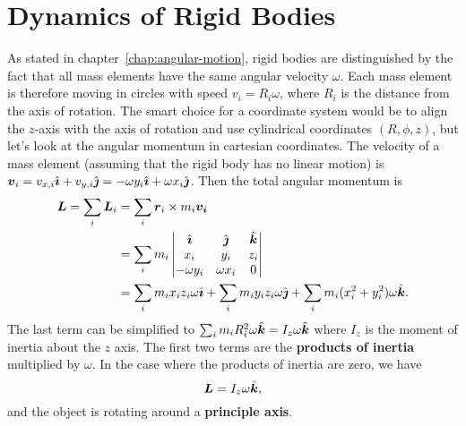\documentclass[../classical_mechanics.tex]{subfiles}
\begin{document}
    \section{Dynamics of Rigid Bodies}\label{sec:dynamics-of-rigid-bodies}
        As stated in chapter~\ref{chap:angular-motion}, rigid bodies are distinguished by the fact that all mass elements have the same angular velocity $\omega$.
        Each mass element is therefore moving in circles with speed $v_i=R_i\omega$, where $R_i$ is the distance from the axis of rotation.
        The smart choice for a coordinate system would be to align the $z$-axis with the axis of rotation and use cylindrical coordinates $(R,\phi,z)$, but let's look at the angular momentum in cartesian coordinates.
        The velocity of a mass element (assuming that the rigid body has no linear motion) is $\boldsymbol{v}_i=v_{x,i}\hat{\boldsymbol{\imath}}+v_{y,i}\hat{\boldsymbol{\jmath}}=-\omega y_i\hat{\boldsymbol{\imath}}+\omega x_i\hat{\boldsymbol{\jmath}}$.
        Then the total angular momentum is
        \begin{align}
            \boldsymbol{L}=\sum_i\boldsymbol{L}_i&=\sum_i\boldsymbol{r}_i\times m_i\boldsymbol{v_i}\\
            &=\sum_i m_i\begin{vmatrix}
                \hat{\boldsymbol{\imath}} & \hat{\boldsymbol{\jmath}} & \hat{\boldsymbol{k}} \\
                x_i & y_i & z_i \\
                -\omega y_i & \omega x_i & 0
            \end{vmatrix}\\
            &=\sum_i m_ix_iz_i\omega\hat{\boldsymbol{\imath}}+\sum_i m_iy_iz_i\omega\hat{\boldsymbol{\jmath}}+\sum_i m_i(x_i^2+y_i^2)\omega\hat{\boldsymbol{k}}.
        \end{align}
        The last term can be simplified to $\sum_i m_iR_i^2\omega\hat{\boldsymbol{k}}=I_z\omega\hat{\boldsymbol{k}}$ where $I_z$ is the moment of inertia about the $z$ axis.
        The first two terms are the \textbf{products of inertia} multiplied by $\omega$.
        In the case where the products of inertia are zero, we have
        \begin{equation}
            \boldsymbol{L}=I_z\omega\hat{\boldsymbol{k}},
        \end{equation}
        and the object is rotating around a \textbf{principle axis}.
\end{document}
